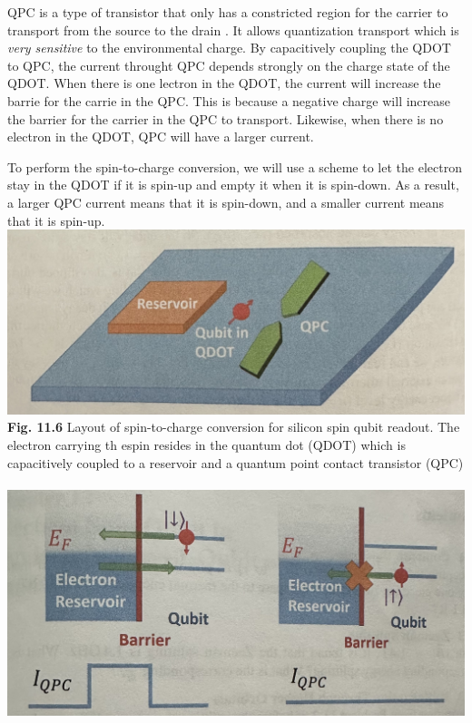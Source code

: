 \documentclass{article}
\begin{document}
QPC is a type of transistor that only has a constricted region for the carrier to
transport from the source to the drain \cite{1avan1996quantum}. It allows quantization transport which is 
\textit{very sensitive} to the environmental charge. By capacitively coupling the QDOT to QPC,
the current throught QPC depends strongly on the charge state of the QDOT.
When there is one lectron in the QDOT, the current will increase the barrie for the carrie in the 
QPC. This is because a negative charge will increase the barrier for the carrier
in the QPC to transport. Likewise, when there is no electron in the QDOT, QPC will have a larger current.

To perform the spin-to-charge conversion, we will use a scheme to let the electron stay in the
QDOT if it is spin-up and empty it when it is spin-down. As a result, a larger QPC current means that
it is spin-down, and a smaller current means that it is spin-up.\\

\includegraphics[scale=0.45]{Fig.11.6.jpg}\\

\textbf{Fig. 11.6} Layout of spin-to-charge conversion for silicon spin qubit readout. The electron carrying th espin resides in the quantum
dot (QDOT) which is capacitively coupled to a reservoir and a quantum point contact transistor (QPC)\\\\

\includegraphics[scale=0.45]{Fig. 11.7.jpg}\\
\end{document}
